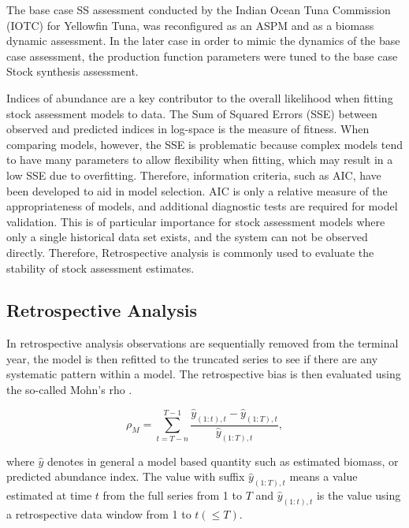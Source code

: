 \documentclass[12pt,halfline,a4paper,nonumbib]{ouparticle}
\newcommand{\disp}{\displaystyle}
\begin{document}
The base case SS assessment conducted by the Indian Ocean Tuna Commission (IOTC) for Yellowfin Tuna, was reconfigured as an ASPM and as a biomass dynamic assessment. In the later case in order to mimic the dynamics of the base case assessment, the production function parameters were tuned to the base case Stock synthesis assessment. 

Indices of abundance are a key contributor to the overall likelihood when fitting stock assessment models to data. The Sum of Squared Errors (SSE) between observed and predicted indices in log-space is the measure of fitness. When comparing models, however, the SSE is problematic because complex models tend to have many parameters to allow flexibility when fitting, which may result in a low SSE due to overfitting. Therefore, information criteria, such as AIC, have been developed to aid in model selection. AIC is only a relative measure of the appropriateness of models, and additional diagnostic tests are required for model validation. This is of particular importance for stock assessment models where only a single historical data set exists, and the system can not be observed directly. Therefore, Retrospective analysis \parencite{hurtado2014looking} is commonly used to evaluate the stability of stock assessment estimates.

\subsection{Retrospective Analysis}

 In retrospective analysis observations are sequentially removed from the terminal year, the model is then refitted to the truncated series to see if there are any systematic pattern within a model. The retrospective bias is then evaluated using the so-called Mohn's rho  \parencite{mohn1999retrospective}.

\begin{equation}
\label{eqn:mohn0}
\rho_M = \disp \sum_{t=T-n}^{T-1} \frac{\hat{y}_{(1:t),t}-\hat{y}_{(1:T),t}}{\hat{y}_{(1:T),t}}, 
\end{equation}

where $\hat{y}$ denotes in general a model based quantity such as estimated biomass, or predicted abundance index. The value with suffix $\hat{y}_{(1:T),t}$ means a value estimated at time $t$ from the full series from 1 to $T$ and  $\hat{y}_{(1:t),t}$ is the value using a retrospective data window from 1 to $t (\leq T)$. 
\end{document}
